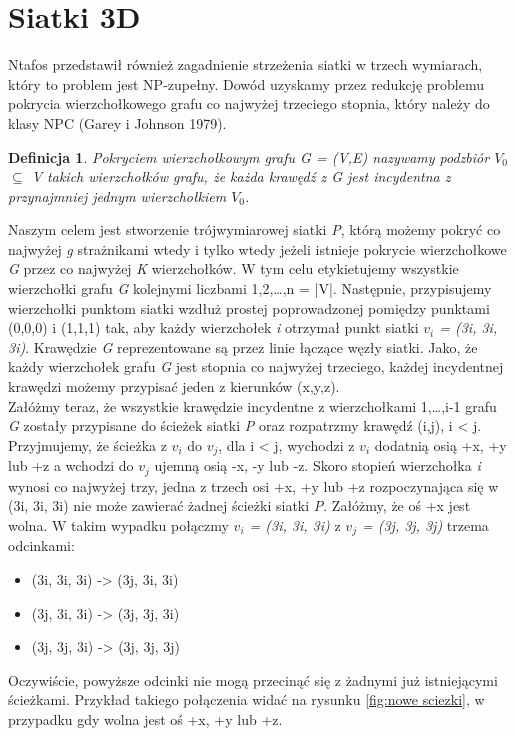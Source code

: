 \documentclass[brudnopis]{xmgr}
\newtheorem{Definicja}{Definicja}
\begin{document}
 \section{Siatki 3D}
 	Ntafos przedstawił również zagadnienie strzeżenia siatki w trzech wymiarach, który to problem jest NP-zupełny. Dowód uzyskamy przez redukcję problemu pokrycia wierzchołkowego grafu co najwyżej trzeciego stopnia, który należy do klasy NPC (Garey i Johnson 1979).
\begin{Definicja}
	Pokryciem wierzchołkowym grafu \textnormal{G = (V,E)} nazywamy podzbiór \textnormal{$V_0$ $\subseteq$ V} takich wierzchołków grafu, że każda krawędź z \textnormal{G} jest incydentna z przynajmniej jednym wierzchołkiem $V_0$.
\end{Definicja}
Naszym celem jest stworzenie trójwymiarowej siatki \textit{P}, którą możemy pokryć co najwyżej \textit{g} strażnikami wtedy i tylko wtedy jeżeli istnieje pokrycie wierzchołkowe \textit{G} przez co najwyżej \textit{K} wierzchołków.
W tym celu etykietujemy wszystkie wierzchołki grafu \textit{G} kolejnymi liczbami 1,2,\ldots,n = |V|. Następnie, przypisujemy wierzchołki punktom siatki wzdłuż prostej poprowadzonej pomiędzy punktami (0,0,0) i (1,1,1) tak, aby każdy wierzchołek \textit{i} otrzymał punkt siatki \textit{$v_i$ = (3i, 3i, 3i)}. Krawędzie \textit{G} reprezentowane są przez linie łączące węzły siatki. Jako, że każdy wierzchołek grafu \textit{G} jest stopnia co najwyżej trzeciego, każdej incydentnej krawędzi możemy przypisać jeden z kierunków (x,y,z).
\\\indent Załóżmy teraz, że wszystkie krawędzie incydentne z wierzchołkami 1,\ldots,i-1 grafu \textit{G} zostały przypisane do ścieżek siatki \textit{P} oraz rozpatrzmy krawędź (i,j), i < j. Przyjmujemy, że ścieżka z $v_i$ do $v_j$, dla i < j, wychodzi z $v_i$ dodatnią osią +x, +y lub +z a wchodzi do $v_j$ ujemną osią -x, -y lub -z. Skoro stopień wierzchołka \textit{i} wynosi co najwyżej trzy, jedna z trzech osi +x, +y lub +z rozpoczynająca się w (3i, 3i, 3i) nie może zawierać żadnej ścieżki siatki \textit{P}. Załóżmy, że oś +x jest wolna. W takim wypadku połączmy \textit{$v_i$ = (3i, 3i, 3i)} z \textit{$v_j$ = (3j, 3j, 3j)} trzema odcinkami:
\begin{itemize}
	\item (3i, 3i, 3i) -> (3j, 3i, 3i)
	\item (3j, 3i, 3i) -> (3j, 3j, 3i)
	\item (3j, 3j, 3i) -> (3j, 3j, 3j)
\end{itemize}
Oczywiście, powyższe odcinki nie mogą przecinąć się z żadnymi już istniejącymi ścieżkami. Przykład takiego połączenia widać na rysunku \ref{fig:nowe sciezki}, w przypadku gdy wolna jest oś +x, +y lub +z.
\end{document}
